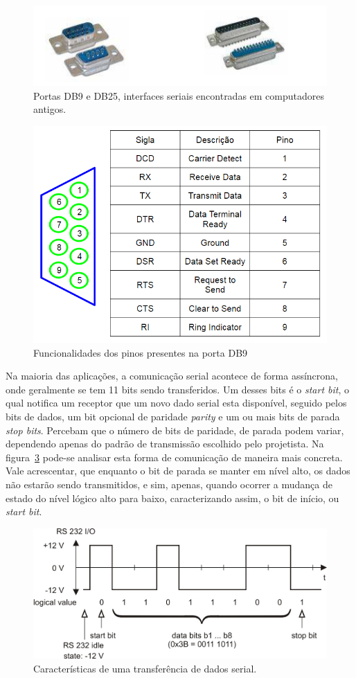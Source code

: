 \documentclass[12pt]{article}
\begin{document}
\begin{figure}[h]
\centering
\includegraphics[width=.5\textwidth]{img/p4/fig8DB9DB25.png}
\caption{Portas DB9 e DB25, interfaces seriais encontradas em computadores antigos.}
\label{fig:db9db25}
\end{figure}

\begin{figure}[h]
\centering
\includegraphics[width=.5\textwidth]{img/p4/Fig9serial_pinos.png}
\caption{Funcionalidades dos pinos presentes na porta DB9}
\label{fig:pinosdb9}
\end{figure}



Na maioria das aplicações, a comunicação serial acontece de forma assíncrona, onde geralmente se tem 11 bits sendo transferidos. Um desses bits é o \textit{start bit}, o qual notifica um receptor que um novo dado serial esta disponível, seguido pelos bits de dados, um bit opcional de paridade \textit{parity} e um ou mais bits de parada \textit{stop bits}\cite{porta-serial}. Percebam que o número de bits de paridade, de parada podem variar, dependendo apenas do padrão de transmissão escolhido pelo projetista. Na figura~\ref{fig:cserial} pode-se analisar esta forma de comunicação de maneira mais concreta. Vale acrescentar, que enquanto o bit de parada se manter em nível alto, os dados não estarão sendo transmitidos, e sim, apenas, quando ocorrer a mudança de estado do nível lógico alto para baixo, caracterizando assim, o bit de início, ou \textit{start bit}. 


\begin{figure}[h]
\centering
\includegraphics[width=.5\textwidth]{img/p4/Fig10rs232.jpg}
\caption{Características de uma transferência de dados serial.}
\label{fig:cserial}
\end{figure}
\end{document}
